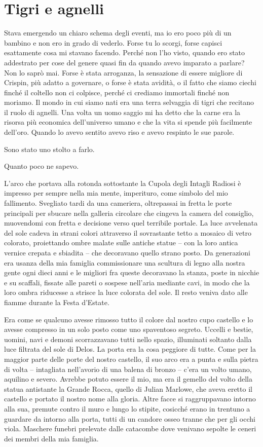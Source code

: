 \chapter{Tigri e agnelli}

Stava emergendo un chiaro schema degli eventi, ma io ero poco più di un
bambino e non ero in grado di vederlo. Forse tu lo scorgi, forse capisci
esattamente cosa mi stavano facendo. Perché non l'ho visto, quando ero
stato addestrato per cose del genere quasi fin da quando avevo imparato
a parlare? Non lo saprò mai. Forse è stata arroganza, la sensazione di
essere migliore di Crispin, più adatto a governare, o forse è stata
avidità, o il fatto che siamo ciechi finché il coltello non ci colpisce,
perché ci crediamo immortali finché non moriamo. Il mondo in cui siamo
nati era una terra selvaggia di tigri che recitano il ruolo di agnelli.
Una volta un uomo saggio mi ha detto che la carne era la risorsa più
economica dell'universo umano e che la vita si spende più facilmente
dell'oro. Quando lo avevo sentito avevo riso e avevo respinto le sue
parole.

Sono stato uno stolto a farlo.

Quanto poco ne sapevo.

L'arco che portava alla rotonda sottostante la Cupola degli Intagli
Radiosi è impresso per sempre nella mia mente, imperituro, come simbolo
del mio fallimento. Svegliato tardi da una cameriera, oltrepassai in
fretta le porte principali per sbucare nella galleria circolare che
cingeva la camera del consiglio, muovendomi con fretta e decisione verso
quel terribile portale. La luce avvelenata del sole cadeva in strani
colori attraverso il sovrastante tetto a mosaico di vetro colorato,
proiettando ombre malate sulle antiche statue -- con la loro antica
vernice crepata e sbiadita -- che decoravano quello strano posto. Da
generazioni era usanza della mia famiglia {commissionare} una scultura
di legno alla nostra gente ogni dieci anni e le migliori fra queste
decoravano la stanza, poste in nicchie e su scaffali, fissate alle
pareti o sospese nell'aria mediante cavi, in modo che la loro ombra
riducesse a strisce la luce colorata del sole. Il resto veniva dato alle
fiamme durante la Festa d'Estate.

Era come se qualcuno avesse rimosso tutto il colore dal nostro cupo
castello e lo avesse compresso in un solo posto come uno spaventoso
segreto. Uccelli e bestie, uomini, navi e demoni scorrazzavano tutti
nello spazio, illuminati soltanto dalla luce filtrata del sole di Delos.
La porta era la cosa peggiore di tutte. Come per la maggior parte delle
porte del nostro castello, il suo arco era a punta e sulla pietra di
volta -- intagliata nell'avorio di una balena di bronzo -- c'era un
volto umano, aquilino e severo. Avrebbe potuto essere il mio, ma era il
gemello del volto della statua antistante la Grande Rocca, quello di
Julian Marlowe, che aveva eretto il castello e portato il nostro nome
alla gloria. Altre facce si raggruppavano intorno alla sua, premute
contro il muro e lungo lo stipite, cosicché erano in trentuno a guardare
da intorno alla porta, tutti di un candore osseo tranne che per gli
occhi viola. Maschere funebri prelevate dalle catacombe dove venivano
sepolte le ceneri dei membri della mia famiglia.

